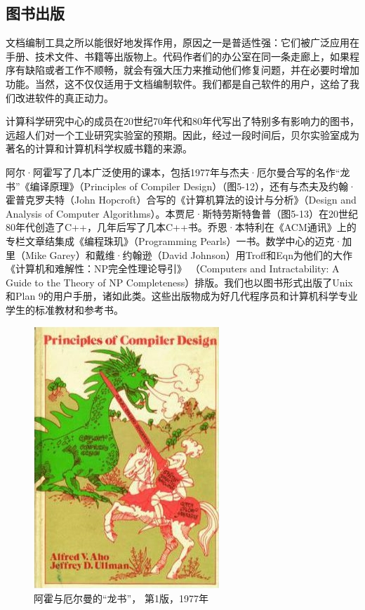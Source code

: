 \documentclass[a4paper,12pt,UTF8,twoside]{ctexbook}
\begin{document}
\subsection{图书出版}

文档编制工具之所以能很好地发挥作用，原因之一是普适性强：它们被广泛应用在手册、技术文件、书籍等出版物上。代码作者们的办公室在同一条走廊上，如果程序有缺陷或者工作不顺畅，就会有强大压力来推动他们修复问题，并在必要时增加功能。当然，这不仅仅适用于文档编制软件。我们都是自己软件的用户，这给了我们改进软件的真正动力。

计算科学研究中心的成员在20世纪70年代和80年代写出了特别多有影响力的图书，远超人们对一个工业研究实验室的预期。因此，经过一段时间后，贝尔实验室成为著名的计算和计算机科学权威书籍的来源。

阿尔·阿霍写了几本广泛使用的课本，包括1977年与杰夫·厄尔曼合写的名作“龙书”《编译原理》（Principles of Compiler Design）（图5-12），还有与杰夫及约翰·霍普克罗夫特（John Hopcroft）合写的《计算机算法的设计与分析》（Design and Analysis of Computer Algorithms）。本贾尼·斯特劳斯特鲁普（图5-13）在20世纪80年代创造了C++，几年后写了几本C++书。乔恩·本特利在《ACM通讯》上的专栏文章结集成《编程珠玑》（Programming Pearls）一书。数学中心的迈克·加里（Mike Garey）和戴维·约翰逊（David Johnson）用Troff和Eqn为他们的大作《计算机和难解性：NP完全性理论导引》 （Computers and Intractability: A Guide to the Theory of NP Completeness）排版。我们也以图书形式出版了Unix 和Plan 9的用户手册，诸如此类。这些出版物成为好几代程序员和计算机科学专业学生的标准教材和参考书。

\begin{figure}[htbp]
	\centering
	\includegraphics[width=0.7\linewidth]{51}
	\caption{阿霍与厄尔曼的“龙书”， 第1版，1977年}
	\label{fig:1}
\end{figure}
\end{document}
